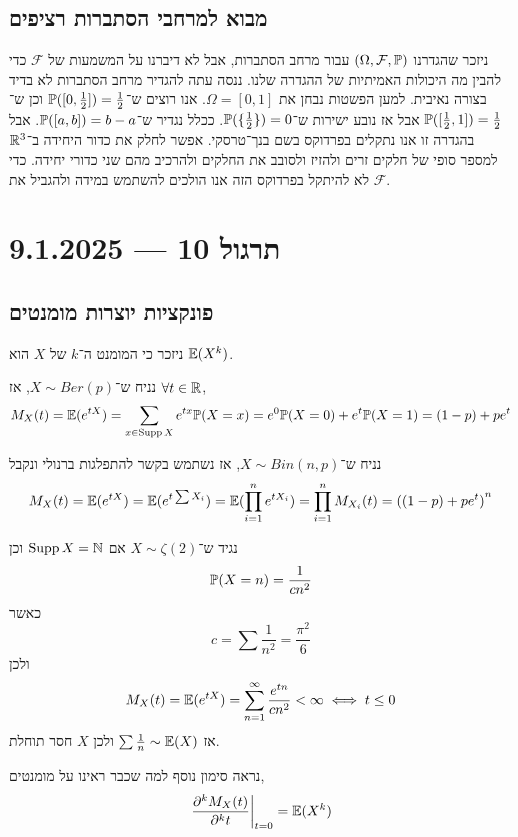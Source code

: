 \subsection{מבוא למרחבי הסתברות רציפים}
ניזכר שהגדרנו $(\Omega, \mathcal{F}, \mathbb{P})$ עבור מרחב הסתברות, אבל לא דיברנו על המשמעות של $\mathcal{F}$ כדי להבין מה היכולות האמיתיות של ההגדרה שלנו.
ננסה עתה להגדיר מרחב הסתברות לא בדיד בצורה נאיבית. למען הפשטות נבחן את $\Omega = [0, 1]$.
אנו רוצים ש־$\mathbb{P}([0, \frac{1}{2}]) = \frac{1}{2}$ וכן ש־$\mathbb{P}([\frac{1}{2}, 1]) = \frac{1}{2}$ אבל אז נובע ישירות ש־$\mathbb{P}(\{\frac{1}{2}\}) = 0$.
ככלל נגדיר ש־$\mathbb{P}([a, b]) = b - a$.
אבל בהגדרה זו אנו נתקלים בפרדוקס בשם בנך־טרסקי.
אפשר לחלק את כדור היחידה ב־$\mathbb{R}^3$ למספר סופי של חלקים זרים ולהזיז ולסובב את החלקים ולהרכיב מהם שני כדורי יחידה.
כדי לא להיתקל בפרדוקס הזה אנו הולכים להשתמש במידה ולהגביל את $\mathcal{F}$.

\section{תרגול 10 --- 9.1.2025}
\subsection{פונקציות יוצרות מומנטים}
ניזכר כי המומנט ה־$k$ של $X$ הוא $\mathbb{E}(X^k)$.
\begin{example}
	נניח ש־$X \sim Ber(p)$, אז $\forall t \in \mathbb{R}$,
	\[
		M_X(t)
		= \mathbb{E}(e^{tX})
		= \sum_{x \in \operatorname{Supp} X} e^{tx} \mathbb{P}(X = x)
		= e^0 \mathbb{P}(X = 0) + e^t \mathbb{P}(X = 1)
		= (1 - p) + p e^t
	\]
\end{example}
\begin{example}
	נניח ש־$X \sim Bin(n, p)$, אז נשתמש בקשר להתפלגות ברנולי ונקבל
	\[
		M_X(t)
		= \mathbb{E}(e^{tX})
		= \mathbb{E}(e^{t \sum X_i})
		= \mathbb{E}(\prod_{i = 1}^n e^{t X_i})
		= \prod_{i = 1}^n M_{X_i}(t)
		= {((1 - p) + p e^t)}^n
	\]
\end{example}
\begin{example}
	נגיד ש־$X \sim \zeta(2)$ אם $\operatorname{Supp} X = \mathbb{N}$ וכן
	\[
		\mathbb{P}(X = n)
		= \frac{1}{c n^2}
	\]
	כאשר
	\[
		c = \sum \frac{1}{n^2} = \frac{\pi^2}{6}
	\]
	ולכן
	\[
		M_X(t)
		= \mathbb{E}(e^{tX})
		= \sum_{n = 1}^{\infty} \frac{e^{tn}}{c n^2}
		< \infty
		\iff
		t \le 0
	\]
	אז $\sum \frac{1}{n} \sim \mathbb{E}(X)$ ולכן $X$ חסר תוחלת.
\end{example}
\begin{remark}
	נראה סימון נוסף למה שכבר ראינו על מומנטים,
	\[
		\left. \frac{\partial^k M_X(t)}{\partial^k t} \right\lvert_{t = 0} = \mathbb{E}(X^k)
	\]
\end{remark}

